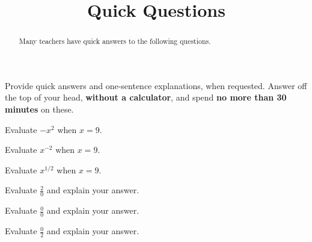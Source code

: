 \documentclass{ximera}
\title{Quick Questions}
\begin{document}
\begin{abstract}
Many teachers have quick answers to the following questions.  
\end{abstract}
\maketitle

Provide quick answers and one-sentence explanations, when requested.  Answer off the top of your head, \textbf{without a calculator}, and spend \textbf{no more than 30 minutes} on these.  

%
%

\begin{question}
Evaluate $-x^2$ when $x=9$.
\begin{freeResponse}
\end{freeResponse}
\end{question}

\begin{question}
Evaluate $x^{-2}$ when $x=9$.
\begin{freeResponse}
\end{freeResponse}
\end{question}

\begin{question}
Evaluate $x^{1/2}$ when $x=9$.
\begin{freeResponse}
\end{freeResponse}
\end{question}

\begin{question}
Evaluate $\frac{2}{0}$ and explain your answer. 
\begin{freeResponse}
\end{freeResponse}
\end{question}

\begin{question}
Evaluate $\frac{0}{0}$ and explain your answer. 
\begin{freeResponse}
\end{freeResponse}
\end{question}

\begin{question}
Evaluate $\frac{0}{2}$ and explain your answer. 
\begin{freeResponse}
\end{freeResponse}
\end{question}
\end{document}
